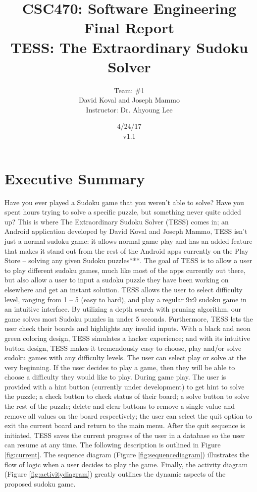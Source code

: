 \documentclass{article}
\title{CSC470: Software Engineering Final Report\\ TESS: The Extraordinary Sudoku Solver}
\author{Team: \#1 \\David Koval and Joseph Mammo\\Instructor: Dr. Ahyoung Lee}
\date{ 4/24/17 \\ v1.1 }
\begin{document}
 
\maketitle

\clearpage

\tableofcontents

\clearpage

\section{Executive Summary} 

Have you ever played a Sudoku game that you weren’t able to solve? Have you spent hours trying to solve a specific puzzle, but something never quite added up? This is where The Extraordinary Sudoku Solver (TESS) comes in; an Android application developed by David Koval and Joseph Mammo, TESS isn’t just a normal sudoku game: it allows normal game play and has an added feature that makes it stand out from the rest of the Android apps currently on the Play Store – solving any given Sudoku puzzles***. \newline \newline
The goal of TESS is to allow a user to play different sudoku games, much like most of the apps currently out there, but also allow a user to input a sudoku puzzle they have been working on elsewhere and get an instant solution. TESS allows the user to select difficulty level, ranging from 1 – 5 (easy to hard), and play a regular 9x9 sudoku game in an intuitive interface. By utilizing a depth search with pruning algorithm, our game solves most Sudoku puzzles in under 5 seconds. Furthermore, TESS lets the user check their boards and highlights any invalid inputs.\newline \newline
With a black and neon green coloring design, TESS simulates a hacker experience; and with its intuitive button design, TESS makes it tremendously easy to choose, play and/or solve sudoku games with any difficulty levels. The user can select play or solve at the very beginning. If the user decides to play a game, then they will be able to choose a difficulty they would like to play. During game play. The user is provided with a hint button (currently under development) to get hint to solve the puzzle; a check button to check status of their board; a solve button to solve the rest of the puzzle; delete and clear buttons to remove a single value and remove all values on the board respectively; the user can select the quit option to exit the current board and return to the main menu. After the quit sequence is initiated, TESS saves the current progress of the user in a database so the user can resume at any time. The following description is outlined in Figure \ref{fig:current}. The sequence diagram (Figure \ref{fig:sequencediagram}) illustrates the flow of logic when a user decides to play the game. Finally, the activity diagram (Figure \ref{fig:activitydiagram}) greatly outlines the dynamic aspects of the proposed sudoku game.  \newline \newline
\end{document}
